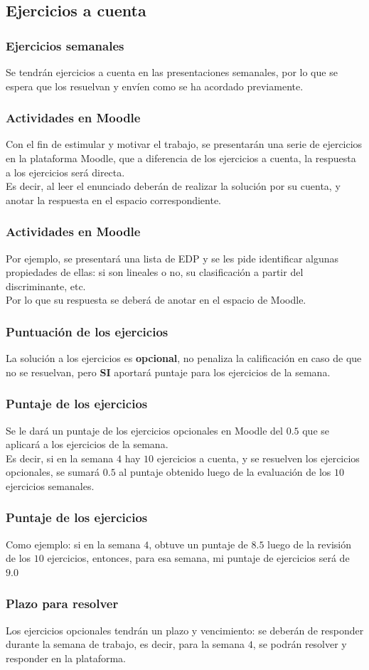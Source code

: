 \subsection{Ejercicios a cuenta}
\begin{frame}
\frametitle{Ejercicios semanales}
Se tendrán ejercicios a cuenta en las presentaciones semanales, por lo que se espera que los resuelvan y envíen como se ha acordado previamente.
\end{frame}
\begin{frame}
\frametitle{Actividades en Moodle}
Con el fin de estimular y motivar el trabajo, se presentarán una serie de ejercicios en la plataforma Moodle, que a diferencia de los ejercicios a cuenta, la respuesta a los ejercicios será directa.
\\
\bigskip
Es decir, al leer el enunciado deberán de realizar la solución por su cuenta, y anotar la respuesta en el espacio correspondiente.
\end{frame}
\begin{frame}
\frametitle{Actividades en Moodle}
Por ejemplo, se presentará una lista de EDP y se les pide identificar algunas propiedades de ellas: si son lineales o no, su clasificación a partir del discriminante, etc.
\\
\bigskip
Por lo que su respuesta se deberá de anotar en el espacio de Moodle.
\end{frame}
\begin{frame}
\frametitle{Puntuación de los ejercicios}
La solución a los ejercicios es \textbf{opcional}, no penaliza la calificación en caso de que no se resuelvan, pero \textbf{SI} aportará puntaje para los ejercicios de la semana.
\end{frame}
\begin{frame}
\frametitle{Puntaje de los ejercicios}
Se le dará un puntaje de los ejercicios opcionales en Moodle del $0.5$ que se aplicará a los ejercicios de la semana.
\\
\bigskip
\pause
Es decir, si en la semana $4$ hay $10$ ejercicios a cuenta, y se resuelven los ejercicios opcionales, se sumará $0.5$ al puntaje obtenido luego de la evaluación de los $10$ ejercicios semanales.
\end{frame}
\begin{frame}
\frametitle{Puntaje de los ejercicios}
Como ejemplo: si en la semana $4$, obtuve un puntaje de $8.5$ luego de la revisión de los $10$ ejercicios, entonces, para esa semana, mi puntaje de ejercicios será de $9.0$
\end{frame}
\begin{frame}
\frametitle{Plazo para resolver}
Los ejercicios opcionales tendrán un plazo y vencimiento: se deberán de responder durante la semana de trabajo, es decir, para la semana $4$, se podrán resolver y responder en la plataforma.
\end{frame}
